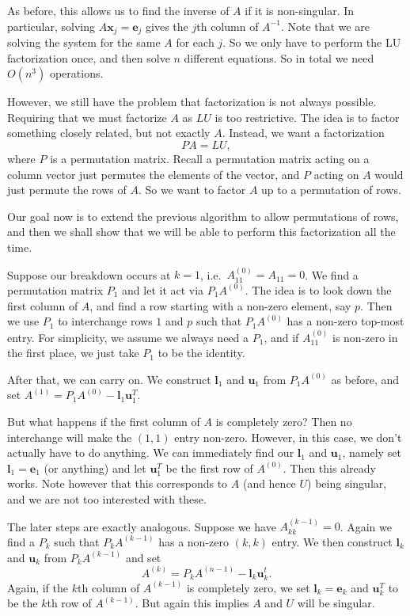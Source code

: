 \documentclass[a4paper]{article}
\begin{document}
As before, this allows us to find the inverse of $A$ if it is non-singular. In particular, solving $A\mathbf{x}_j = \mathbf{e}_j$ gives the $j$th column of $A^{-1}$. Note that we are solving the system for the same $A$ for each $j$. So we only have to perform the LU factorization once, and then solve $n$ different equations. So in total we need $O(n^3)$ operations.

However, we still have the problem that factorization is not always possible. Requiring that we must factorize $A$ as $LU$ is too restrictive. The idea is to factor something closely related, but not exactly $A$. Instead, we want a factorization
\[
  PA = LU,
\]
where $P$ is a permutation matrix. Recall a permutation matrix acting on a column vector just permutes the elements of the vector, and $P$ acting on $A$ would just permute the rows of $A$. So we want to factor $A$ up to a permutation of rows.

Our goal now is to extend the previous algorithm to allow permutations of rows, and then we shall show that we will be able to perform this factorization all the time.

Suppose our breakdown occurs at $k = 1$, i.e.\ $A_{11}^{(0)} = A_{11} = 0$. We find a permutation matrix $P_1$ and let it act via $P_1A^{(0)}$. The idea is to look down the first column of $A$, and find a row starting with a non-zero element, say $p$. Then we use $P_1$ to interchange rows $1$ and $p$ such that $P_1A^{(0)}$ has a non-zero top-most entry. For simplicity, we assume we always need a $P_1$, and if $A_{11}^{(0)}$ is non-zero in the first place, we just take $P_1$ to be the identity.

After that, we can carry on. We construct $\mathbf{l}_1$ and $\mathbf{u}_1$ from $P_1A^{(0)}$ as before, and set $A^{(1)} = P_1A^{(0)} - \mathbf{l}_1 \mathbf{u}_1^T$.

But what happens if the first column of $A$ is completely zero? Then no interchange will make the $(1, 1)$ entry non-zero. However, in this case, we don't actually have to do anything. We can immediately find our $\mathbf{l}_1$ and $\mathbf{u}_1$, namely set $\mathbf{l}_1 = \mathbf{e}_1$ (or anything) and let $\mathbf{u}_1^T$ be the first row of $A^{(0)}$. Then this already works. Note however that this corresponds to $A$ (and hence $U$) being singular, and we are not too interested with these.

The later steps are exactly analogous. Suppose we have $A_{kk}^{(k - 1)} = 0$. Again we find a $P_k$ such that $P_k A^{(k - 1)}$ has a non-zero $(k, k)$ entry. We then construct $\mathbf{l}_k$ and $\mathbf{u}_k$ from $P_k A^{(k - 1)}$ and set
\[
  A^{(k)} = P_k A^{(n - 1)} - \mathbf{l}_k \mathbf{u}_k^t.
\]
Again, if the $k$th column of $A^{(k - 1)}$ is completely zero, we set $\mathbf{l}_k = \mathbf{e}_k$ and $\mathbf{u}_k^T$ to be the $k$th row of $A^{(k - 1)}$. But again this implies $A$ and $U$ will be singular.
\end{document}
